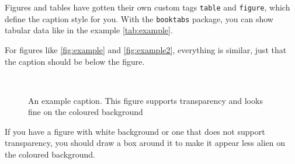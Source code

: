\documentclass[
]{dtuposter}
\begin{document}
\begin{dtupostercontent}
Figures and tables have gotten their own custom tags \texttt{table} and 
\texttt{figure}, which define the caption style for you. With the \texttt{booktabs}
package, you can show tabular data like in the example \autoref{tab:example}.

For figures like \autoref{fig:example} and \autoref{fig:example2}, everything is 
similar, just that the caption should be below the figure. 

\begin{figure}
	\centering
{}\\
\caption{An example caption. This figure supports transparency and looks fine on 
the coloured background}\label{fig:example}
\end{figure}

If you have a figure with white background or one that does not support transparency,
you should draw a box around it to make it appear less alien on the coloured background.


\end{dtupostercontent}
\end{document}
